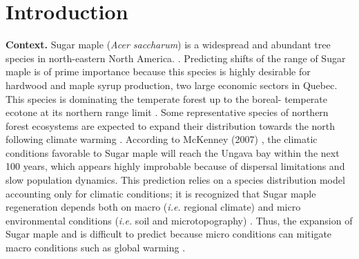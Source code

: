


\newpage
\setcounter{page}{1}

\section{Introduction}

\textbf{Context.} Sugar maple (\textit{Acer saccharum}) is a widespread and
abundant tree species in north-eastern North America.
\cite{Graignic2013,Messaoud2007,Kellman2004,Barras1998}. Predicting shifts of
the range of Sugar maple is of prime importance because this species is highly
desirable for hardwood and maple syrup production, two large economic sectors
in Quebec. This species is dominating the temperate forest up to the boreal-
temperate ecotone at its northern range limit \cite{Barras1998}. Some
representative species of northern forest ecosystems are expected to expand
their distribution towards the north following climate warming
\cite{Sciences2014,Iverson2002}. According to McKenney (2007)
\cite{Sciences2014}, the climatic conditions  favorable to Sugar maple  will
reach the Ungava bay within the next 100 years, which appears highly
improbable because of dispersal limitations and slow population dynamics.
This prediction relies on a species distribution model accounting only for
climatic conditions; it is recognized that Sugar maple regeneration depends
both on macro  (\textit{i.e.} regional climate) and micro environmental
conditions (\textit{i.e.} soil and microtopography)
\cite{Graignic2013,Lafleur2010}. Thus, the expansion of Sugar maple and is
difficult to predict because micro conditions can mitigate macro conditions
such as global warming \cite{DeFrenne2013}.\\ 

